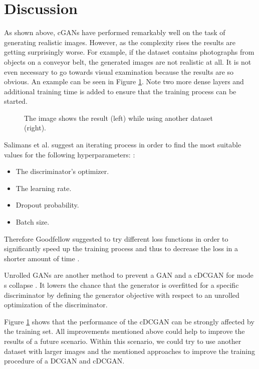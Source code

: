 \documentclass[journal]{IEEEtran}
\begin{document}
{\section{Discussion}

As shown above, cGANs have performed remarkably well on the task of generating realistic images. However, as the complexity rises the results are getting surprisingly worse. For example, if the dataset contains photographs from objects on a conveyor belt, the generated images are not realistic at all. It is not even necessary to go towards visual examination because the results are so obvious. An example can be seen in Figure \ref{fig:cdcgan-results-compared-madi-dataset}. Note two more dense layers and additional training time is added to ensure that the training process can be started.

\begin{figure}[htp]
	\centering
	\caption{
		The image shows the result (left) while using another dataset (right).
	}
	\label{fig:cdcgan-results-compared-madi-dataset}
\end{figure}

Salimans et al. suggest an iterating process in order to find the most suitable values for the following hyperparameters: \cite{DBLP:journals/corr/SalimansGZCRC16}:
\begin{itemize}
\item The discriminator’s optimizer.
\item The learning rate.
\item Dropout probability.
\item Batch size.
\end{itemize}

Therefore Goodfellow suggested to try different loss functions in order to significantly speed up the training process and thus to decrease the loss in a shorter amount of time \cite{DBLP:journals/corr/Goodfellow17}. 

Unrolled GANs are another method to prevent a GAN and a cDCGAN for mode s collapse \cite{DBLP:journals/corr/Goodfellow17}. It lowers the chance that the generator is overfitted for a specific discriminator by defining the generator objective with respect to an unrolled optimization of the discriminator.

Figure \ref{fig:cdcgan-results-compared-madi-dataset} shows that the performance of the cDCGAN can be strongly affected by the training set. All improvements mentioned above could help to improve the results of a future scenario. Within this scenario, we could try to use another dataset with larger images and the mentioned approaches to improve the training procedure of a DCGAN and cDCGAN.
 
}
\end{document}
